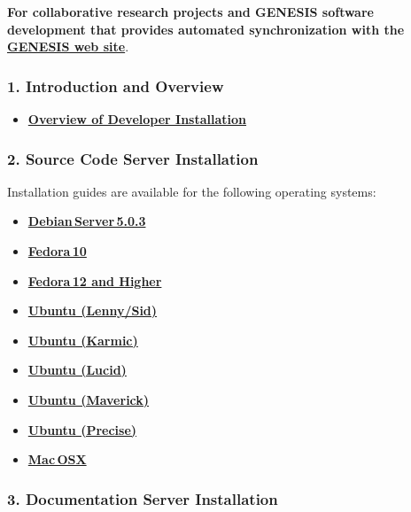 \documentclass[12pt]{article}
\begin{document}
{\bf For collaborative research projects and GENESIS software development that provides automated synchronization with the \href{http://www.genesis-sim.org/}{\bf GENESIS web site}}.

\subsubsection*{1. Introduction and Overview}

\begin{itemize}
   \item[]\href{../developer-installation/developer-installation.tex}{\bf Overview of Developer Installation}
\end{itemize}

\subsubsection*{2. Source Code Server Installation}

Installation guides are available for the following operating systems:
\begin{itemize}
   \item[]\href{../installation-debian-server/installation-debian-server.tex}{\bf Debian\,Server\,5.0.3}
   \item[]\href{../installation-fedora10/installation-fedora10.tex}{\bf Fedora\,10}
   \item[]\href{../installation-fedora12/installation-fedora12.tex}{\bf Fedora\,12 and Higher}
   \item[]\href{../installation-ubuntu-lennysid/installation-ubuntu-lennysid.tex}{\bf Ubuntu (Lenny/Sid)}
   \item[]\href{../installation-ubuntu-karmic/installation-ubuntu-karmic.tex}{\bf Ubuntu (Karmic)}
   \item[]\href{../installation-ubuntu-lucid/installation-ubuntu-lucid.tex}{\bf Ubuntu (Lucid)}
   \item[]\href{../installation-ubuntu-maverick/installation-ubuntu-maverick.tex}{\bf Ubuntu (Maverick)}
   \item[]\href{../installation-ubuntu-precise/installation-ubuntu-precise.tex}{\bf Ubuntu (Precise)}
   \item[]\href{../installation-osx/installation-osx.tex}{\bf Mac\,OSX}
\end{itemize}

\subsubsection*{3. Documentation Server Installation}
\end{document}
